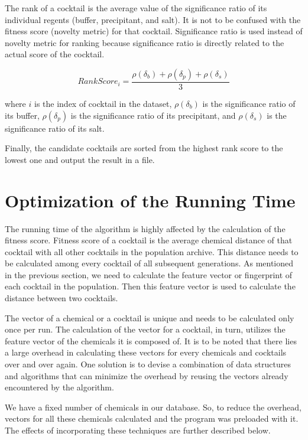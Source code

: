 The rank of a cocktail is the average value of the significance ratio of its individual regents (buffer, precipitant, and salt). It is not to be confused with the fitness score (novelty metric) for that cocktail. Significance ratio is used instead of novelty metric for ranking because significance ratio is directly related to the actual score of the cocktail.

\begin{equation}
RankScore_{i} = \frac{\rho(\delta_{b}) + \rho(\delta_{p}) + \rho(\delta_{s})}{3}
\label{eq}
\end{equation}

\noindent
where $i$ is the index of cocktail in the dataset, $\rho(\delta_{b})$ is the significance ratio of its buffer, $\rho(\delta_{p})$ is the significance ratio of its precipitant, and $\rho(\delta_{s})$ is the significance ratio of its salt\cite{OptimizeAED}.

Finally, the candidate cocktails are sorted from the highest rank score to the lowest one and output the result in a file. 


\section{Optimization of the Running Time}\label{sec:GA-runtime}

The running time of the algorithm is highly affected by the calculation of the fitness score. Fitness score of a cocktail is the average chemical distance of that cocktail with all other cocktails in the population archive. This distance needs to be calculated among every cocktail of all subsequent generations. As mentioned in the previous section, we need to calculate the feature vector or fingerprint of each cocktail in the population. Then this feature vector is used to calculate the distance between two cocktails.

The vector of a chemical or a cocktail is unique and needs to be calculated only once per run. The calculation of the vector for a cocktail, in turn, utilizes the feature vector of the chemicals it is composed of. It is to be noted that there lies a large overhead in calculating these vectors for every chemicals and cocktails over and over again. One solution is to devise a combination of data structures and algorithms that can minimize the overhead by reusing the vectors already encountered by the algorithm.

We have a fixed number of chemicals in our database. So, to reduce the overhead, vectors for all these chemicals calculated and the program was preloaded with it. The effects of incorporating these techniques are further described below.


